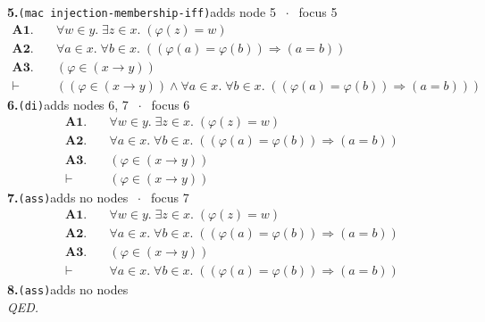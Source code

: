 \documentclass[11pt]{article}
\begin{document}
\medskip\noindent\textbf{5.}\quad \texttt{(mac injection-membership-iff)}\hfill{\small adds node 5 $\;\cdot\;$ focus 5}\\[2pt]
\begin{align*}
  \mathbf{A1.}\quad & \forall w \in y.\; \exists z \in x.\; (\varphi(z) = w) \\
  \mathbf{A2.}\quad & \forall a \in x.\; \forall b \in x.\; ((\varphi(a) = \varphi(b)) \Rightarrow (a = b)) \\
  \mathbf{A3.}\quad & (\varphi \in (x \to y)) \\
  \vdash\quad & ((\varphi \in (x \to y)) \wedge \forall a \in x.\; \forall b \in x.\; ((\varphi(a) = \varphi(b)) \Rightarrow (a = b)))
\end{align*}
\medskip\noindent\textbf{6.}\quad \texttt{(di)}\hfill{\small adds nodes 6, 7 $\;\cdot\;$ focus 6}\\[2pt]
\begin{align*}
  \mathbf{A1.}\quad & \forall w \in y.\; \exists z \in x.\; (\varphi(z) = w) \\
  \mathbf{A2.}\quad & \forall a \in x.\; \forall b \in x.\; ((\varphi(a) = \varphi(b)) \Rightarrow (a = b)) \\
  \mathbf{A3.}\quad & (\varphi \in (x \to y)) \\
  \vdash\quad & (\varphi \in (x \to y))
\end{align*}
\medskip\noindent\textbf{7.}\quad \texttt{(ass)}\hfill{\small adds no nodes $\;\cdot\;$ focus 7}\\[2pt]
\begin{align*}
  \mathbf{A1.}\quad & \forall w \in y.\; \exists z \in x.\; (\varphi(z) = w) \\
  \mathbf{A2.}\quad & \forall a \in x.\; \forall b \in x.\; ((\varphi(a) = \varphi(b)) \Rightarrow (a = b)) \\
  \mathbf{A3.}\quad & (\varphi \in (x \to y)) \\
  \vdash\quad & \forall a \in x.\; \forall b \in x.\; ((\varphi(a) = \varphi(b)) \Rightarrow (a = b))
\end{align*}
\medskip\noindent\textbf{8.}\quad \texttt{(ass)}\hfill{\small adds no nodes}\\[2pt]
\emph{QED.}\par
\end{document}
